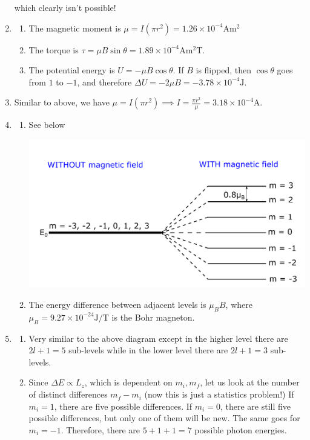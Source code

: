 \documentclass{article}
\begin{document}
\begin{enumerate}[label=(9.\arabic*)]
    which clearly isn't possible!
    \item \begin{enumerate}
        \item The magnetic moment is $\mu = I(\pi r^2) = 1.26 \times 10^{-4} \si{\ampere\meter\squared}$
        \item The torque is $\tau = \mu B \sin\theta = 1.89\times 10^{-4} \si{\ampere\meter\squared\tesla}.$
        \item The potential energy is $U = -\mu B\cos\theta.$ If $B$ is flipped, then $\cos\theta$ goes from $1$ to $-1$, and therefore $\Delta U = -2\mu B = -3.78\times 10^{-4} \si{\joule}.$
    \end{enumerate}
    \setcounter{enumi}{10}
    \item Similar to above, we have $\mu = I(\pi r^2) \implies I = \frac{\pi r^2}{\mu} = 3.18\times 10^{-4}\si{\ampere}.$
    \setcounter{enumi}{14}
    \item \begin{enumerate}
        \item See below
        \begin{center}
            \includegraphics[width=0.7\linewidth]{figs/9.15.png}
        \end{center}
        \item The energy difference between adjacent levels is $\mu_B B$, where $\mu_B=9.27\times 10^{-24} \si{\joule\per\tesla}$ is the Bohr magneton.
    \end{enumerate}
    \setcounter{enumi}{16}
    \item \begin{enumerate}
        \item Very similar to the above diagram except in the higher level there are $2l+1=5$ sub-levels while in the lower level there are $2l+1=3$ sub-levels.
        \item Since $\Delta E \propto L_z$, which is dependent on $m_i,m_f$, let us look at the number of distinct differences $m_f-m_i$ (now this is just a statistics problem!) If $m_i=1$, there are five possible differences. If $m_i=0$, there are still five possible differences, but only one of them will be new. The same goes for $m_i=-1$. Therefore, there are $5+1+1=7$ possible photon energies.

\end{enumerate}
\end{enumerate}
\end{document}
